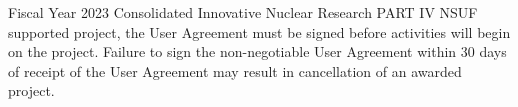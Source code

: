 Fiscal Year 2023 Consolidated Innovative Nuclear Research PART IV NSUF
supported project, the User Agreement must be signed before activities will
begin on the project. Failure to sign the non-negotiable User Agreement within
30 days of receipt of the User Agreement may result in cancellation of an
awarded project.

